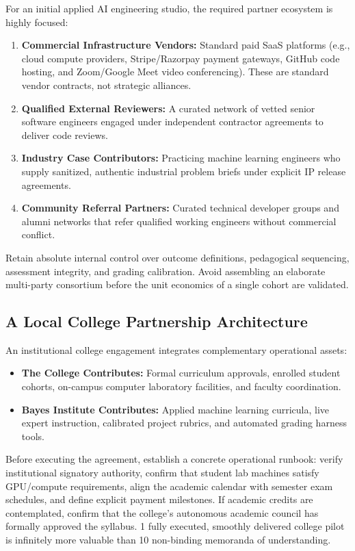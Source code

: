 For an initial applied AI engineering studio, the required partner ecosystem is highly focused:
\begin{enumerate}
\item \textbf{Commercial Infrastructure Vendors:} Standard paid SaaS platforms (e.g., cloud compute providers, Stripe/Razorpay payment gateways, GitHub code hosting, and Zoom/Google Meet video conferencing). These are standard vendor contracts, not strategic alliances.
\item \textbf{Qualified External Reviewers:} A curated network of vetted senior software engineers engaged under independent contractor agreements to deliver code reviews.
\item \textbf{Industry Case Contributors:} Practicing machine learning engineers who supply sanitized, authentic industrial problem briefs under explicit IP release agreements.
\item \textbf{Community Referral Partners:} Curated technical developer groups and alumni networks that refer qualified working engineers without commercial conflict.
\end{enumerate}
Retain absolute internal control over outcome definitions, pedagogical sequencing, assessment integrity, and grading calibration. Avoid assembling an elaborate multi-party consortium before the unit economics of a single cohort are validated.

\subsection{A Local College Partnership Architecture}
\label{sec:local_college_partnership_architecture}

An institutional college engagement integrates complementary operational assets:
\begin{itemize}
\item \textbf{The College Contributes:} Formal curriculum approvals, enrolled student cohorts, on-campus computer laboratory facilities, and faculty coordination.
\item \textbf{Bayes Institute Contributes:} Applied machine learning curricula, live expert instruction, calibrated project rubrics, and automated grading harness tools.
\end{itemize}

Before executing the agreement, establish a concrete operational runbook: verify institutional signatory authority, confirm that student lab machines satisfy GPU/compute requirements, align the academic calendar with semester exam schedules, and define explicit payment milestones. If academic credits are contemplated, confirm that the college's autonomous academic council has formally approved the syllabus. 1 fully executed, smoothly delivered college pilot is infinitely more valuable than 10 non-binding memoranda of understanding.

